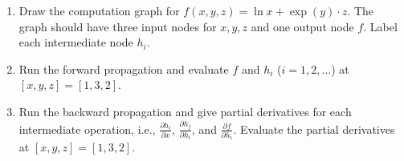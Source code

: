     
    \begin{enumerate}
        \item Draw the computation graph for $f(x, y, z) = \ln x + \exp(y) \cdot z$. The graph should have three input nodes for $x, y, z$ and one output node $f$. Label each intermediate node $h_i$. \\
        \item Run the forward propagation and evaluate $f$ and $h_i$ ($i=1, 2, \dots$) at $[x, y, z] = [1, 3, 2]$.\\
        \item Run the backward propagation and give partial derivatives for each intermediate operation, i.e., $\frac{\partial h_i}{\partial x}$, $\frac{\partial h_j}{\partial h_i}$, and $\frac{\partial f}{\partial h_i}$. Evaluate the partial derivatives at $[x, y, z] = [1, 3, 2]$.\\
\end{enumerate}
